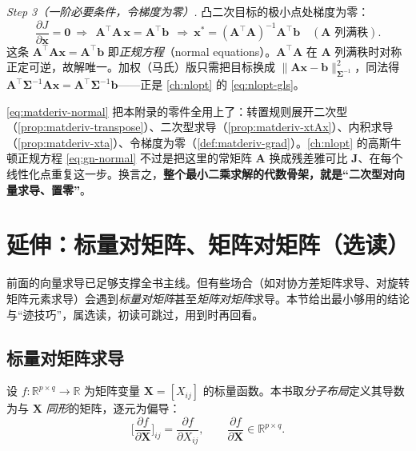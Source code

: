 \begin{derivation}[最小二乘正规方程 $\mathbf{A}^\top\mathbf{A}\mathbf{x}=\mathbf{A}^\top\mathbf{b}$]
\emph{Step 3（一阶必要条件，令梯度为零）.} 凸二次目标的极小点处梯度为零：
\begin{equation}
  \frac{\partial J}{\partial\mathbf{x}}=\mathbf{0}
  \ \Longrightarrow\
  \boxed{\ \mathbf{A}^\top\mathbf{A}\,\mathbf{x}=\mathbf{A}^\top\mathbf{b}\ }
  \ \Longrightarrow\
  \mathbf{x}^*=(\mathbf{A}^\top\mathbf{A})^{-1}\mathbf{A}^\top\mathbf{b}
  \quad(\mathbf{A}\text{ 列满秩}).
  \label{eq:matderiv-normal}
\end{equation}
这条 $\mathbf{A}^\top\mathbf{A}\mathbf{x}=\mathbf{A}^\top\mathbf{b}$ 即\emph{正规方程}（normal equations）。$\mathbf{A}^\top\mathbf{A}$ 在 $\mathbf{A}$ 列满秩时对称正定可逆，故解唯一。加权（马氏）版只需把目标换成 $\|\mathbf{A}\mathbf{x}-\mathbf{b}\|_{\boldsymbol{\Sigma}^{-1}}^2$，同法得 $\mathbf{A}^\top\boldsymbol{\Sigma}^{-1}\mathbf{A}\mathbf{x}=\mathbf{A}^\top\boldsymbol{\Sigma}^{-1}\mathbf{b}$——正是 \cref{ch:nlopt} 的 \cref{eq:nlopt-gls}。
\end{derivation}

\begin{insight}
\cref{eq:matderiv-normal} 把本附录的零件全用上了：转置规则展开二次型（\cref{prop:matderiv-transpose}）、二次型求导（\cref{prop:matderiv-xtAx}）、内积求导（\cref{prop:matderiv-xta}）、令梯度为零（\cref{def:matderiv-grad}）。\cref{ch:nlopt} 的高斯牛顿正规方程 \cref{eq:gn-normal} 不过是把这里的常矩阵 $\mathbf{A}$ 换成残差雅可比 $\mathbf{J}$、在每个线性化点重复这一步。换言之，\textbf{整个最小二乘求解的代数骨架，就是“二次型对向量求导、置零”}。
\end{insight}

\section{延伸：标量对矩阵、矩阵对矩阵（选读）}
\label{sec:matderiv-matrix}

前面的向量求导已足够支撑全书主线。但有些场合（如对协方差矩阵求导、对旋转矩阵元素求导）会遇到\emph{标量对矩阵}甚至\emph{矩阵对矩阵}求导。本节给出最小够用的结论与“迹技巧”，属选读，初读可跳过，用到时再回看。

\subsection{标量对矩阵求导}
\label{sec:matderiv-scalar-mat}

\begin{definition}[标量对矩阵求导]\label{def:matderiv-scalar-mat}
设 $f:\mathbb{R}^{p\times q}\to\mathbb{R}$ 为矩阵变量 $\mathbf{X}=[X_{ij}]$ 的标量函数。本书取\emph{分子布局}定义其导数为与 $\mathbf{X}$ \emph{同形}的矩阵，逐元为偏导：
\begin{equation}
  \Big[\frac{\partial f}{\partial\mathbf{X}}\Big]_{ij}=\frac{\partial f}{\partial X_{ij}},
  \qquad \frac{\partial f}{\partial\mathbf{X}}\in\mathbb{R}^{p\times q}.
  \label{eq:matderiv-scalar-mat}
\end{equation}
\end{definition}

